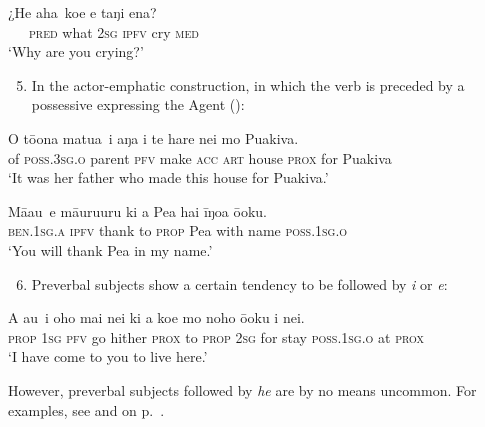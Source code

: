 \ea\label{ex:7.81}
\gll ¿{\ob}He aha\,{\cb} koe e taŋi ena?\\
~~~\textsc{pred} what \textsc{2sg} \textsc{ipfv} cry \textsc{med}\\

\glt
‘Why are you crying?’ \textstyleExampleref{[Mtx-7-12.024]}
\z

\begin{enumerate}
\setcounter{enumi}{4} 
\item 
In the actor-emphatic construction, in which the verb is preceded by a possessive expressing the Agent ():

\end{enumerate}

\ea\label{ex:7.82}
\gll {\ob}O tō{\ꞌ}ona matu{\ꞌ}a\,{\cb} i aŋa i te hare nei mo Puakiva. \\
{\db}of \textsc{poss.3sg.o} parent \textsc{pfv} make \textsc{acc} \textsc{art} house \textsc{prox} for Puakiva \\

\glt 
‘It was her father who made this house for Puakiva.’ \textstyleExampleref{[R229.269]} 
\z

\ea\label{ex:7.83}
\gll {\ob}Mā{\ꞌ}au\,{\cb} e māuruuru ki a Pea hai {\ꞌ}īŋoa ō{\ꞌ}oku. \\
{\db}\textsc{ben.1sg.a} \textsc{ipfv} thank to \textsc{prop} Pea with name \textsc{poss.1sg.o} \\

\glt
‘You will thank Pea in my name.’ \textstyleExampleref{[R229.086]} 
\z

\begin{enumerate}
\setcounter{enumi}{5} 
\item 
Preverbal subjects show a certain tendency to be followed by \textit{i} or \textit{e}:

\end{enumerate}

\ea\label{ex:7.84}
\gll {\ob}A au\,{\cb} i oho mai nei ki a koe mo noho ō{\ꞌ}oku {\ꞌ}i nei. \\
{\db}\textsc{prop} \textsc{1sg} \textsc{pfv} go hither \textsc{prox} to \textsc{prop} \textsc{2sg} for stay \textsc{poss.1sg.o} at \textsc{prox} \\

\glt
‘I have come to you to live here.’ \textstyleExampleref{[R245.072]} 
\z

However, preverbal subjects followed by \textit{he} are by no means uncommon. For examples, see  and  on p.~\pageref{ex:8.69}.

